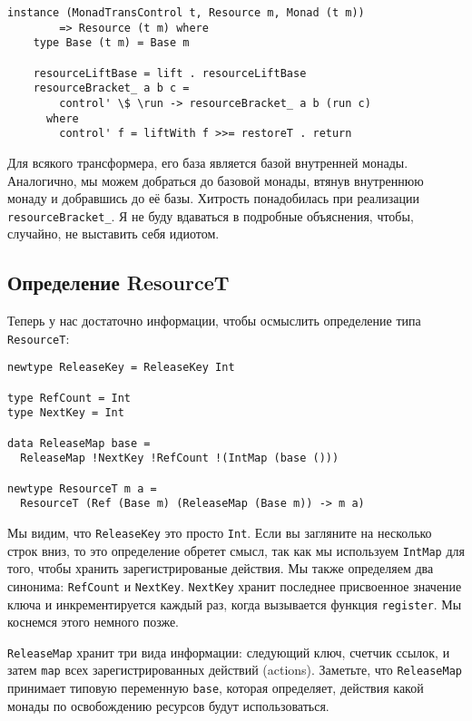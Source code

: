\begin{lstlisting}
instance (MonadTransControl t, Resource m, Monad (t m))
        => Resource (t m) where
    type Base (t m) = Base m

    resourceLiftBase = lift . resourceLiftBase
    resourceBracket_ a b c =
        control' \$ \run -> resourceBracket_ a b (run c)
      where
        control' f = liftWith f >>= restoreT . return 
\end{lstlisting}
Для всякого трансформера, его база является базой внутренней монады. Аналогично, мы можем
добраться до базовой монады, втянув внутреннюю монаду и добравшись до её базы. Хитрость
понадобилась при реализации \verb=resourceBracket_=. Я не буду вдаваться в подробные
объяснения, чтобы, случайно, не выставить себя идиотом. 

\subsection{Определение ResourceT}

Теперь у нас достаточно информации, чтобы осмыслить определение типа
\lstinline'ResourceT':
\begin{lstlisting}
newtype ReleaseKey = ReleaseKey Int

type RefCount = Int
type NextKey = Int

data ReleaseMap base =
  ReleaseMap !NextKey !RefCount !(IntMap (base ()))

newtype ResourceT m a =
  ResourceT (Ref (Base m) (ReleaseMap (Base m)) -> m a)
\end{lstlisting}
Мы видим, что \lstinline'ReleaseKey' это просто \lstinline'Int'. Если вы загляните на
несколько строк вниз, то
это определение обретет смысл, так как мы используем \lstinline'IntMap' для того, чтобы
хранить
зарегистрированые действия. Мы также определяем два синонима: \lstinline'RefCount' и
\lstinline'NextKey'. \lstinline'NextKey'
хранит последнее присвоенное значение ключа и инкрементируется каждый раз, когда
вызывается функция \verb=register=. Мы коснемся этого немного позже.

\lstinline'ReleaseMap' хранит три вида информации: следующий ключ, счетчик ссылок, и затем
\lstinline'map' всех
зарегистрированных действий (actions). Заметьте, что \lstinline'ReleaseMap' принимает
типовую переменную \lstinline'base', которая определяет, действия какой монады по
освобождению ресурсов  будут использоваться.

